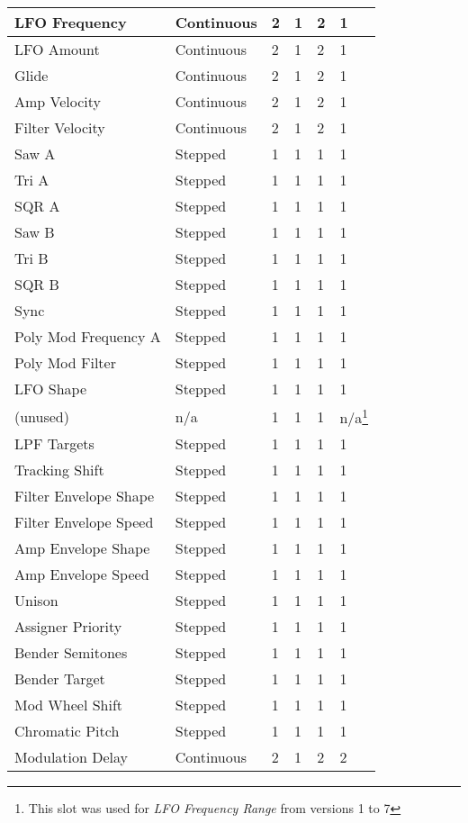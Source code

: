 \begin{longtable}[l]{|p{5cm}|p{2cm}|p{1.5cm}|p{1.5cm}|p{2cm}|p{2.5cm}|}
LFO Frequency & Continuous & 2 & 1 & 2 & 1 \\ \hline
LFO Amount & Continuous & 2 & 1 & 2 & 1 \\ \hline
Glide & Continuous & 2 & 1 & 2 & 1 \\ \hline
Amp Velocity & Continuous & 2 & 1 & 2 & 1 \\ \hline
Filter Velocity & Continuous & 2 & 1 & 2 & 1 \\ \hline
Saw A & Stepped & 1 & 1 & 1 & 1 \\ \hline
Tri A & Stepped & 1 & 1 & 1 & 1 \\ \hline
SQR A & Stepped & 1 & 1 & 1 & 1 \\ \hline
Saw B & Stepped & 1 & 1 & 1 & 1 \\ \hline
Tri B & Stepped & 1 & 1 & 1 & 1 \\ \hline
SQR B & Stepped & 1 & 1 & 1 & 1 \\ \hline
Sync & Stepped & 1 & 1 & 1 & 1 \\ \hline
Poly Mod Frequency A & Stepped & 1 & 1 & 1 & 1 \\ \hline
Poly Mod Filter & Stepped & 1 & 1 & 1 & 1 \\ \hline
LFO Shape & Stepped & 1 & 1 & 1 & 1 \\ \hline
(unused) & n/a  & 1 & 1 & 1 & n/a\footnote{This slot was used for \textit{LFO Frequency Range} from versions 1 to 7} \\ \hline
LPF Targets & Stepped & 1 & 1 & 1 & 1 \\ \hline
Tracking Shift & Stepped & 1 & 1 & 1 & 1 \\ \hline
Filter Envelope Shape & Stepped & 1 & 1 & 1 & 1 \\ \hline
Filter Envelope Speed & Stepped & 1 & 1 & 1 & 1 \\ \hline
Amp Envelope Shape & Stepped & 1 & 1 & 1 & 1 \\ \hline
Amp Envelope Speed & Stepped & 1 & 1 & 1 & 1 \\ \hline
Unison & Stepped & 1 & 1 & 1 & 1 \\ \hline
Assigner Priority & Stepped & 1 & 1 & 1 & 1 \\ \hline
Bender Semitones & Stepped & 1 & 1 & 1 & 1 \\ \hline
Bender Target & Stepped & 1 & 1 & 1 & 1 \\ \hline
Mod Wheel Shift & Stepped & 1 & 1 & 1 & 1 \\ \hline
Chromatic Pitch & Stepped & 1 & 1 & 1 & 1 \\ \hline
Modulation Delay & Continuous & 2 & 1 & 2 & 2 \\ \hline

\end{longtable}
